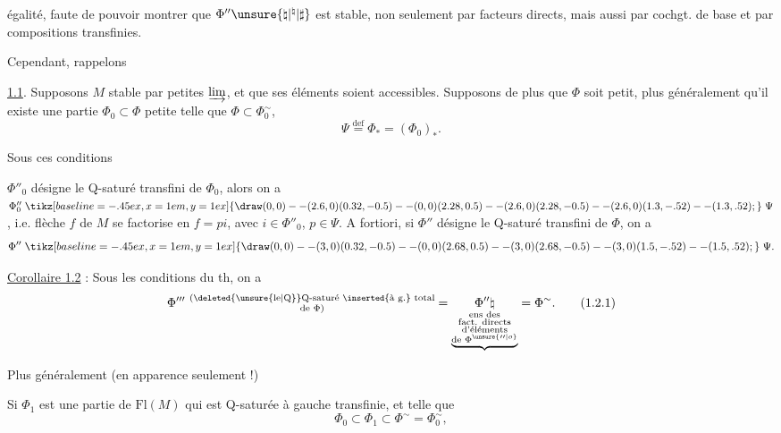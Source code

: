 
égalité, faute de pouvoir montrer que $\Phi''\unsure{\natural|{}^{\natural}|\sharp}$
est stable, non seulement par facteurs directs, mais aussi par cochgt.
de base et par compositions transfinies.

Cependant, rappelons

\uline{ 1.1}.
Supposons $M$ stable par petites $\varinjlim$, et que ses éléments
soient accessibles. Supposons de plus que $\Phi$ soit petit, plus
généralement qu'il existe une partie $\Phi_0\subset\Phi$ petite telle
que $\Phi\subset\Phi_0^{\sim}$, 
\[
 \Psi\overset{\mathrm{def}}{=}\Phi_*=(\Phi_0)_* .\tag*{(1.1.1)}
\]

Sous ces conditions

$\Phi''_0$ désigne le Q-saturé  transfini
 de $\Phi_0$, alors on a
$\Phi''_0 \mathrel{\tikz[baseline=-.45ex,x=1em,y=1ex]{\draw (0,0)--(2.6,0) (0.32,-0.5)--(0,0) (2.28,0.5)--(2.6,0) (2.28,-0.5)--(2.6,0) (1.3,-.52)--(1.3,.52);}} \Psi$, i.e.  flèche $f$ de $M$ se
factorise en $f=pi$, avec $i\in\Phi''_0$, $p\in\Psi$.
A fortiori, si $\Phi''$ désigne le Q-saturé   transfini de $\Phi$, on a \deleted{$\unsure{\Phi}$}
\[
 \Phi'' \mathrel{\tikz[baseline=-.45ex,x=1em,y=1ex]{\draw (0,0)--(3,0) (0.32,-0.5)--(0,0) (2.68,0.5)--(3,0) (2.68,-0.5)--(3,0) (1.5,-.52)--(1.5,.52);}} \Psi .
\]

\uline{Corollaire 1.2} : Sous les conditions
du th, on a
\[
 \Phi'''\ \substack{\text{(\deleted{\unsure{le|Q}}Q-saturé \inserted{à g.} total}\\
                      \text{de }\Phi\text{)}}
 =\underset{\underbrace{\substack{\text{ens des}\\\text{fact. directs}\\
             \text{d'éléments}\\\text{de }\Phi^{\unsure{\prime\prime|o}}}}}
          {\Phi''\natural}
 =\Phi^{\sim} .\tag*{(1.2.1)}
\]

Plus généralement (en apparence seulement !)

Si $\Phi_1$ est une partie de $\mathrm{Fl}(M)$ qui est Q-saturée à
gauche transfinie, et telle que
\[
 \Phi_0\subset\Phi_1\subset\Phi^{\sim}=\Phi_0^{\sim},
\]
